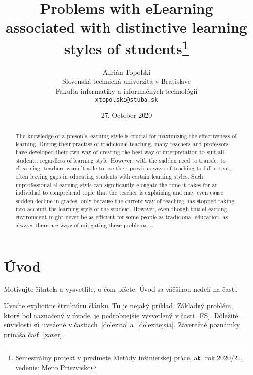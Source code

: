 \documentclass[10pt,twoside,english,a4paper]{article}
\title{Problems with eLearning associated with distinctive learning styles of students\thanks{Semestrálny projekt v predmete Metódy inžinierskej práce, ak. rok 2020/21, vedenie: Meno Priezvisko}} %
\author{Adrián Topolski\\[2pt]
	{\small Slovenská technická univerzita v Bratislave}\\
	{\small Fakulta informatiky a informačných technológií}\\
	{\small \texttt{xtopolski@stuba.sk}}
	}
\date{\small 27. October 2020} %
\begin{document}
\maketitle

\begin{abstract}
The knowledge of a preson's learning style is crucial for maximizing the effectiveness of learning. During their practise of tradicional teaching, many teachers and professors have developed their own way of creating the best way of interpretation to suit all students, regardless of learning style. However, with the sudden need to transfer to eLearning, teachers weren't able to use their previous ways of teaching to full extent, often leaving gaps in educating students with certain learning styles. Such unprofessional eLearning style can significantly elongate the time it takes for an individual to comprehend topic that the teacher is explaining and may even cause sudden decline in grades, only because the current way of teaching has stopped taking into account the learning style of the student. However, even though this eLearning environment might never be as efficient for some people as tradicional education, as always, there are ways of mitigating these problems. 
\ldots
\end{abstract}



\section{Úvod} 



Motivujte čitateľa a vysvetlite, o čom píšete. Úvod sa väčšinou nedelí na časti.

Uveďte explicitne štruktúru článku. Tu je nejaký príklad.
Základný problém, ktorý bol naznačený v úvode, je podrobnejšie vysvetlený v časti~\ref{FS}.
Dôležité súvislosti sú uvedené v častiach~\ref{dolezita} a~\ref{dolezitejsia}.
Záverečné poznámky prináša časť~\ref{zaver}.
\end{document}
